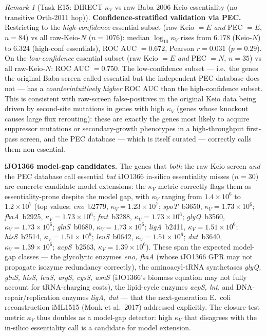 \documentclass[11pt,a4paper]{article}
\theoremstyle{plain}
\theoremstyle{definition}
\theoremstyle{remark}
\newtheorem{remark}[theorem]{Remark}
\begin{document}
\begin{remark}[Task E15: DIRECT $\kappa_V$ vs raw Baba 2006 Keio
essentiality (no transitive Orth-2011 hop)]
\textbf{Confidence-stratified validation via PEC.} Restricting
to the \emph{high-confidence} essential subset (raw Keio $= E$
\emph{and} PEC $= E$, $n = 84$) vs all raw-Keio-$N$ ($n = 1076$):
median $\log_{10} \kappa_V$ rises from $6.178$ (Keio-$N$) to
$6.324$ (high-conf essentials), ROC AUC $= 0.672$, Pearson
$r = 0.031$ ($p = 0.29$). On the \emph{low-confidence} essential
subset (raw Keio $= E$ \emph{and} PEC $= N$, $n = 35$) vs all
raw-Keio-$N$: ROC AUC $= 0.750$. The low-confidence subset ---
i.e.\ the genes the original Baba screen called essential but
the independent PEC database does not --- has a
\emph{counterintuitively higher} ROC AUC than the
high-confidence subset. This is consistent with raw-screen
false-positives in the original Keio data being driven by
second-site mutations in genes with high $\kappa_V$ (genes
whose knockout causes large flux rerouting): these are exactly
the genes most likely to acquire suppressor mutations or
secondary-growth phenotypes in a high-throughput first-pass
screen, and the PEC database --- which is itself curated ---
correctly calls them non-essential.

\textbf{iJO1366 model-gap candidates.} The genes that
\emph{both} the raw Keio screen \emph{and} the PEC database call
essential \emph{but} iJO1366 in-silico essentiality misses
($n = 30$) are concrete candidate model extensions: the
$\kappa_V$ metric correctly flags them as essentiality-prone
despite the model gap, with $\kappa_V$ ranging from
$1.4 \times 10^6$ to $1.2 \times 10^7$ (top values:
\emph{eno}~b2779, $\kappa_V = 1.23 \times 10^7$;
\emph{spoT}~b3650, $\kappa_V = 1.73 \times 10^6$;
\emph{fbaA}~b2925, $\kappa_V = 1.73 \times 10^6$;
\emph{fmt}~b3288, $\kappa_V = 1.73 \times 10^6$;
\emph{glyQ}~b3560, $\kappa_V = 1.73 \times 10^6$;
\emph{glnS}~b0680, $\kappa_V = 1.73 \times 10^6$;
\emph{ligA}~b2411, $\kappa_V = 1.51 \times 10^6$;
\emph{hisS}~b2514, $\kappa_V = 1.51 \times 10^6$;
\emph{leuS}~b0642, $\kappa_V = 1.51 \times 10^6$;
\emph{dut}~b3640, $\kappa_V = 1.39 \times 10^6$;
\emph{acpS}~b2563, $\kappa_V = 1.39 \times 10^6$).
These span the expected model-gap classes --- the glycolytic
enzymes \emph{eno, fbaA} (whose iJO1366 GPR may not propagate
isozyme redundancy correctly), the aminoacyl-tRNA synthetases
\emph{glyQ, glnS, hisS, leuS, argS, cysS, asnS} (iJO1366's
biomass equation may not fully account for tRNA-charging
costs), the lipid-cycle enzymes \emph{acpS, lnt}, and
DNA-repair/replication enzymes \emph{ligA, dut} --- that the
next-generation E.~coli reconstruction iML1515 (Monk et
al.~2017) addressed explicitly. The closure-test metric
$\kappa_V$ thus doubles as a model-gap detector: high
$\kappa_V$ that disagrees with the in-silico essentiality call
is a candidate for model extension.


\end{remark}
\end{document}
